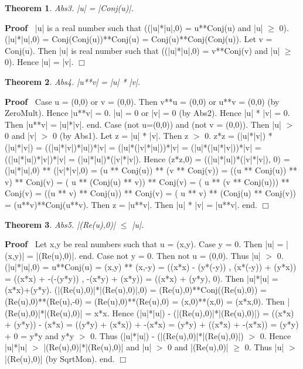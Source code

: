 \documentclass{article}
\newenvironment{forthel}{\begin{leftbar}}{\end{leftbar}}
\newenvironment{proof}{\noindent\textbf{Proof\ }}{\hspace*{\fill}$\Box$\medskip}
\newtheorem{theorem}{Theorem}
\begin{document}
\begin{forthel}
\begin{theorem}
 Abs3. |u| = |Conj(u)|.
\end{theorem}\begin{proof}
 	|u| is a real number such that ((|u|*|u|,0) = u**Conj(u) and |u| $\geq$ 0). 
(|u|*|u|,0) = Conj(Conj(u))**Conj(u) = Conj(u)**Conj(Conj(u)).
Let v = Conj(u). Then |u| is real number such that ((|u|*|u|,0) = v**Conj(v) and |u| $\geq$ 0). 
Hence |u| = |v|.
\end{proof}


\begin{theorem}
 Abs4. |u**v| = |u| * |v|.
\end{theorem}\begin{proof}
 	Case u = (0,0) or v = (0,0). Then v**u = (0,0) or u**v = (0,0) (by ZeroMult). Hence |u**v| = 0.
|u| = 0 or |v| = 0 (by Abs2). Hence |u| * |v| = 0.
Then  |u**v| = |u|*|v|. end.
Case (not u=(0,0)) and (not v = (0,0)). Then |u| $>$ 0 and |v| $>$ 0 (by Abs1). Let z = |u| * |v|. Then z $>$ 0.
z*z = (|u|*|v|) * (|u|*|v|) = ((|u|*|v|)*|u|)*|v| = (|u|*(|v|*|u|))*|v|
= (|u|*(|u|*|v|))*|v| = ((|u|*|u|)*|v|)*|v| = (|u|*|u|)*(|v|*|v|).
Hence (z*z,0)	= ((|u|*|u|)*(|v|*|v|), 0) = (|u|*|u|,0) ** (|v|*|v|,0)
= (u  **  Conj(u)) ** (v   ** Conj(v)) 
= ((u **  Conj(u)) **  v)  ** Conj(v) 
= ( u ** (Conj(u)  **  v)) ** Conj(v) 
= ( u ** (v  **  Conj(u))) ** Conj(v) 
= ((u **  v) **  Conj(u))  ** Conj(v) 
= ( u **  v) **  (Conj(u)   ** Conj(v)) = (u**v)**Conj(u**v).
Then z = |u**v|. Then |u| * |v| = |u**v|. end.
\end{proof}


\begin{theorem}
 Abs5. |(Re(u),0)| $\leq$ |u|.
\end{theorem}\begin{proof}
 	Let x,y be real numbers such that u = (x,y). 
Case y = 0. Then |u| = |(x,y)| = |(Re(u),0)|. end.
Case not y = 0. Then not u = (0,0). Thus |u| $>$ 0.
(|u|*|u|,0) = u**Conj(u) = (x,y) ** (x,-y) = ((x*x) - (y*(-y)) , (x*(-y)) + (y*x)) = ((x*x) + -(-(y*y)) , -(x*y) + (x*y)) 
= ((x*x) + (y*y), 0). Then |u|*|u| = (x*x)+(y*y).
(|(Re(u),0)|*|(Re(u),0)|,0) = (Re(u),0)**Conj((Re(u),0)) = (Re(u),0)**(Re(u),-0) = (Re(u),0)**(Re(u),0) = (x,0)**(x,0) = (x*x,0).
Then |(Re(u),0)|*|(Re(u),0)| = x*x.
Hence (|u|*|u|) -  (|(Re(u),0)|*|(Re(u),0)|) = ((x*x) + (y*y)) - (x*x) = ((y*y) + (x*x)) + -(x*x) = (y*y) + ((x*x) + -(x*x)) = (y*y) + 0 = y*y and y*y $>$ 0.
Thus (|u|*|u|) -  (|(Re(u),0)|*|(Re(u),0)|) $>$ 0.
Hence |u|*|u| $>$ |(Re(u),0)|*|(Re(u),0)| and |u| $>$ 0 and |(Re(u),0)| $\geq$ 0.
Thus  |u| $>$ |(Re(u),0)| (by SqrtMon).
end.
\end{proof}



\end{forthel}
\end{document}
